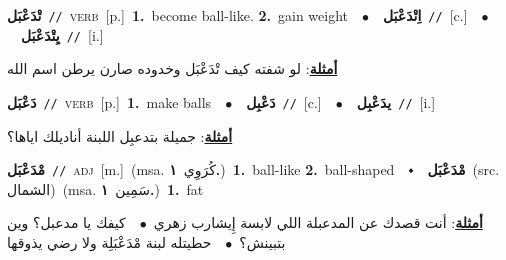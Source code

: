 \documentclass[10pt,a4paper,twoside]{article} %
\begin{document}
\begin{multicols}{2}
{\setlength\topsep{0pt}\textbf{\foreignlanguage{arabic}{تْدَعْبَل}}\ {\color{gray}\texttt{//}\color{black}}\ \textsc{verb}\ [p.]\ \textbf{1.}~become ball-like.  \textbf{2.}~gain weight\ \ $\bullet$\ \ \setlength\topsep{0pt}\textbf{\foreignlanguage{arabic}{اِتْدَعْبَل}}\ {\color{gray}\texttt{//}\color{black}}\ [c.]\ \ $\bullet$\ \ \setlength\topsep{0pt}\textbf{\foreignlanguage{arabic}{يِتْدَعْبَل}}\ {\color{gray}\texttt{//}\color{black}}\ [i.]\  \begin{flushright}\color{gray}\foreignlanguage{arabic}{\textbf{\underline{\foreignlanguage{arabic}{أمثلة}}}: لو شفته كيف تْدَعْبَل وخدوده صارن يرطن اسم الله}\end{flushright}\color{black}} \vspace{2mm}

{\setlength\topsep{0pt}\textbf{\foreignlanguage{arabic}{دَعْبَل}}\ {\color{gray}\texttt{//}\color{black}}\ \textsc{verb}\ [p.]\ \textbf{1.}~make balls\ \ $\bullet$\ \ \setlength\topsep{0pt}\textbf{\foreignlanguage{arabic}{دَعْبِل}}\ {\color{gray}\texttt{//}\color{black}}\ [c.]\ \ $\bullet$\ \ \setlength\topsep{0pt}\textbf{\foreignlanguage{arabic}{يدَعْبِل}}\ {\color{gray}\texttt{//}\color{black}}\ [i.]\  \begin{flushright}\color{gray}\foreignlanguage{arabic}{\textbf{\underline{\foreignlanguage{arabic}{أمثلة}}}: جميلة بتدعبِل اللبنة أناديلك اياها؟}\end{flushright}\color{black}} \vspace{2mm}

{\setlength\topsep{0pt}\textbf{\foreignlanguage{arabic}{مْدَعْبَل}}\ {\color{gray}\texttt{//}\color{black}}\ \textsc{adj}\ [m.]\ \color{gray}(msa. \foreignlanguage{arabic}{كُرَوِي}~\foreignlanguage{arabic}{\textbf{١.}})\color{black}\ \textbf{1.}~ball-like  \textbf{2.}~ball-shaped\ \ $\smblkdiamond$\ \ \setlength\topsep{0pt}\textbf{\foreignlanguage{arabic}{مْدَعْبَل}}\ (src. \color{gray}\foreignlanguage{arabic}{الشمال}\color{black})\ \color{gray}(msa. \foreignlanguage{arabic}{سَمِين}~\foreignlanguage{arabic}{\textbf{١.}})\color{black}\ \textbf{1.}~fat\  \begin{flushright}\color{gray}\foreignlanguage{arabic}{\textbf{\underline{\foreignlanguage{arabic}{أمثلة}}}: أنت قصدك عن المدعبلة اللي لابسة إِيشارب زهري\ $\bullet$\ \  كيفك يا مدعبل؟ وين بتبينش؟\ $\bullet$\ \  حطيتله لبنة مْدَعْبَلِة ولا رضي يذوقها}\end{flushright}\color{black}} \vspace{2mm}


\end{multicols}
\end{document}
